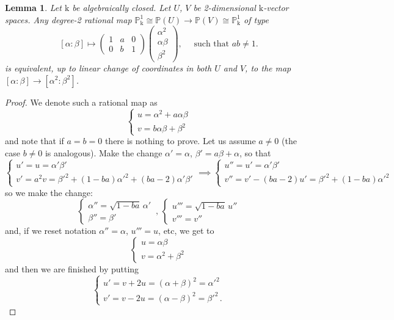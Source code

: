\documentclass[10pt,reqno]{amsart}
\newcommand{\PP}{\mathbb P}
\renewcommand{\a}{\alpha}
\renewcommand{\b}{\beta}
\newcommand{\kk}{\mathrm{k}}
\newtheorem{lemma}[theorem]{Lemma}
\theoremstyle{definition}
\begin{document}
\begin{lemma}\label{lem:rational-maps-equivalence-classes}
Let $\kk$ be algebraically closed. Let $U$, $V$ be 2-dimensional $\kk$-vector spaces. Any degree-2 rational map $\PP^1_{\kk}\cong \PP(U) \to \PP(V) \cong \PP^1_{\kk}$ of type
\[
[\a : \b] \mapsto 
\begin{pmatrix}
    1 & a & 0 \\
    0 & b & 1
\end{pmatrix} 
\begin{pmatrix}
    \a^2 \\
    \a \b \\
    \b^2
\end{pmatrix} , \quad
\text{ such that }
ab \ne 1.
\]
is equivalent, up to linear change of coordinates in both $U$ and $V$, to the map $[\a:\b] \to [\a^2: \b^2]$.
\end{lemma}
\begin{proof}
We denote such a rational map as
\[
\begin{cases}
    u=\a^2 + a \a \b  \\
    v=b \a \b + \b^2
\end{cases}
\]
and note that if $a=b=0$ there is nothing to prove. Let us assume $a \ne 0$ (the case $b \ne 0$ is analogous). Make the change $\a'=\a$, $\b'=a \b + \a$, so that
\[
\begin{cases}
    u'=u=\a' \b'  \\
    v'=a^2v= \b'^2+(1-ba) \a'^2+(ba-2)\a' \b'
\end{cases}
\implies 
\begin{cases}
    u''=u'=\a' \b'  \\
    v''=v'-(ba-2)u'= \b'^2+(1-ba) \a'^2
\end{cases}
\]
so we make the change:
\[
\begin{cases}
    \a''=\sqrt{1-ba} \, \a'  \\
    \b''=\b'
\end{cases} 
\, , \, 
\begin{cases}
    u'''=\sqrt{1-ba} \, u'' \\
     v'''=v''
\end{cases}
\]
and, if we reset notation $\a''=\a$, $u'''=u$, etc, we get to
\[
\begin{cases}
    u=\a \b  \\
    v=\a^2 +  \b^2
\end{cases}
\]
and then we are finished by putting
\[
\begin{cases}
    u'=v+2u=(\a + \b)^2=\a'^2  \\
    v'=v-2u=(\a-\b)^2=\b'^2 \, .
\end{cases}
\]
\end{proof}
\end{document}
